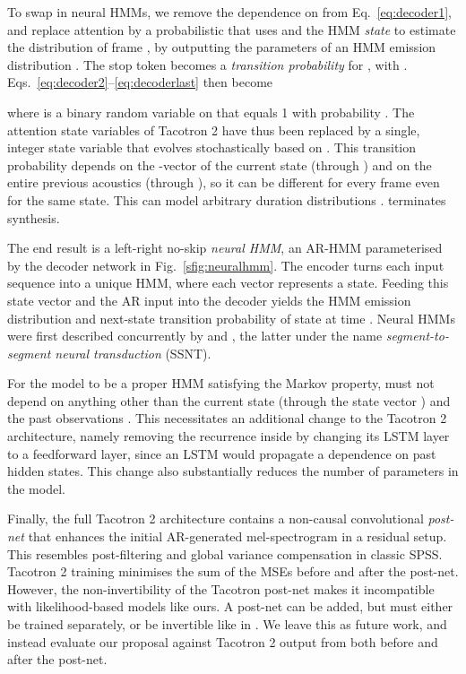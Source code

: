 \documentclass[british]{article}
\begin{document}
To swap in neural HMMs, we remove
the dependence on  from Eq.\ \eqref{eq:decoder1}, and replace attention by a probabilistic  that uses  and the HMM \emph{state}  to estimate the distribution of
frame , by outputting the parameters  of an HMM emission distribution .
The stop token becomes a \emph{transition probability}  for , 
with .
Eqs.\ \eqref{eq:decoder2}--\eqref{eq:decoderlast} then become

where  is a binary random variable on  that equals 1 with probability .
The attention state variables  of Tacotron 2 have thus been replaced by a single, integer state variable  that evolves stochastically based on .
This transition probability depends on the -vector of the current state  (through ) and on the entire previous acoustics  (through ), so it can be different for every frame  even for the same state.
This can model arbitrary duration distributions \cite{ronanki2016median}.
 terminates synthesis.

The end result is a left-right no-skip \emph{neural HMM}, an AR-HMM parameterised by the decoder network in Fig.\ \ref{sfig:neuralhmm}.
The encoder turns each input sequence
into a unique HMM, where each vector  represents a state.
Feeding this state vector and the AR input  into the decoder yields the HMM emission distribution  and next-state transition probability  of state  at time .
Neural HMMs were first described concurrently by \cite{tran2016unsupervised} and \cite{yu2016online}, the latter under the name \emph{segment-to-segment neural transduction} (SSNT).


For the model to be a proper HMM satisfying the Markov property,  must not depend on anything other than the current state  (through the state vector ) and the past observations .
This necessitates an additional change to the Tacotron 2 architecture, namely removing the recurrence inside  by changing its LSTM layer to a feedforward layer, since
an LSTM would propagate a dependence on past hidden states.
This change also substantially reduces the number of parameters in the model.


Finally, the full Tacotron 2 architecture contains a non-causal convolutional \emph{post-net} that enhances the initial AR-generated mel-spectrogram in a residual setup.
This
resembles post-filtering and global variance compensation \cite{toda2007speech} in classic SPSS.
Tacotron 2 training minimises the sum of the MSEs before and after the post-net.
However, the non-invertibility of the Tacotron post-net makes it incompatible with likelihood-based models like ours.
A post-net can be added, but must either be trained separately,
or be invertible like in \cite{kim2020glow}.
We leave this as future work,
and instead evaluate our proposal against Tacotron 2 output from both before and after the post-net.
\end{document}
